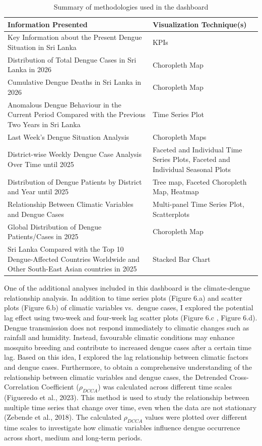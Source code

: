\documentclass[
  letterpaper,
  DIV=11,
  numbers=noendperiod]{scrartcl}
\begin{document}
\begin{table}[H]
\centering
\caption{Summary of methodologies used in the dashboard}
\begin{tabularx}{\textwidth}{|X|p{4cm}|}
\hline
\textbf{Information Presented} & \textbf{Visualization Technique(s)} \\
\hline
Key Information about the Present Dengue Situation in Sri Lanka & KPIs \\
\hline
Distribution of Total Dengue Cases in Sri Lanka in 2026 & Choropleth Map \\
\hline
Cumulative Dengue Deaths in Sri Lanka in 2026 & Choropleth Map \\
\hline
Anomalous Dengue Behaviour in the Current Period Compared with the Previous Two Years in Sri Lanka & Time Series Plot \\
\hline
Last Week's Dengue Situation Analysis & Choropleth Maps \\
\hline
District-wise Weekly Dengue Case Analysis Over Time until 2025 & Faceted and Individual Time Series Plots, Faceted and Individual Seasonal Plots \\
\hline
Distribution of Dengue Patients by District and Year until 2025 & Tree map, Faceted Choropleth Map, Heatmap \\
\hline
Relationship Between Climatic Variables and Dengue Cases & Multi-panel Time Series Plot, Scatterplots \\
\hline
Global Distribution of Dengue Patients/Cases in 2025 & Choropleth Map \\
\hline
Sri Lanka Compared with the Top 10 Dengue-Affected Countries Worldwide and Other South-East Asian countries in 2025 & Stacked Bar Chart \\
\hline
\end{tabularx}
\end{table}

One of the additional analyses included in this dashboard is the
climate-dengue relationship analysis. In addition to time series plots
(Figure 6.a) and scatter plots (Figure 6.b) of climatic variables
vs.~dengue cases, I explored the potential lag effect using two-week and
four-week lag scatter plots (Figure 6.c , Figure 6.d). Dengue
transmission does not respond immediately to climatic changes such as
rainfall and humidity. Instead, favourable climatic conditions may
enhance mosquito breeding and contribute to increased dengue cases after
a certain time lag. Based on this idea, I explored the lag relationship
between climatic factors and dengue cases. Furthermore, to obtain a
comprehensive understanding of the relationship between climatic
variables and dengue cases, the Detrended Cross-Correlation Coefficient
(\(\rho_{DCCA}\)) was calculated across different time scales (Figueredo
et al., 2023). This method is used to study the relationship between
multiple time series that change over time, even when the data are not
stationary (Zebende et al., 2018). The calculated \(\rho_{DCCA}\) values
were plotted over different time scales to investigate how climatic
variables influence dengue occurrence across short, medium and long-term
periods.
\end{document}
